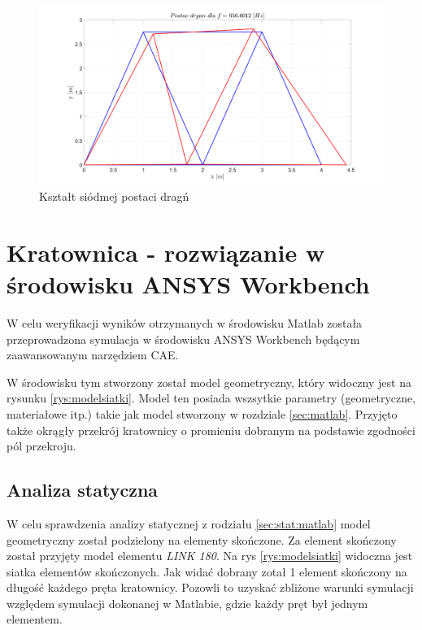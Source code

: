 \documentclass[12pt, a4papper, twoside]{article}
\begin{document}
\begin{figure}[H]
    \centering
    \includegraphics[width=\textwidth, height=0.6\textwidth]{postac_dragn_7.png}
    \caption{Kształt siódmej postaci dragń}
    \label{postac7}
\end{figure}

\section{Kratownica - rozwiązanie w środowisku ANSYS Workbench}
\label{sec:work}

W celu weryfikacji wyników otrzymanych w środowisku Matlab została przeprowadzona symulacja w środowisku ANSYS Workbench będącym zaawansowanym narzędziem CAE.

W środowisku tym stworzony został model geometryczny, który widoczny jest na rysunku \ref{rys:modelsiatki}. Model ten posiada wszsytkie parametry (geometryczne, materiałowe itp.) takie jak model stworzony w rozdziale \ref{sec:matlab}. Przyjęto także okrągły przekrój kratownicy o promieniu dobranym na podstawie zgodności pól przekroju.

\subsection{Analiza statyczna}
\label{sec:ansys:statyczna}

W celu sprawdzenia analizy statycznej z rodziału \ref{sec:stat:matlab} model geometryczny został podzielony na elementy skończone. Za element skończony został przyjęty model elementu \textit{LINK 180}. Na rys \ref{rys:modelsiatki} widoczna jest siatka elementów skończonych. Jak widać dobrany zotał 1 element skończony na długość każdego pręta kratownicy. Pozowli to uzyskać zbliżone warunki symulacji względem symulacji dokonanej w Matlabie, gdzie każdy pręt był jednym elementem.
\end{document}
